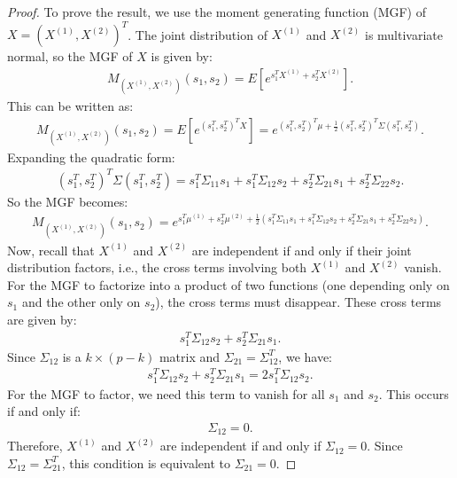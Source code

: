 \begin{proof}
    To prove the result, we use the moment generating function (MGF) of $ X = (X^{(1)}, X^{(2)})^T $. The joint distribution of $ X^{(1)} $ and $ X^{(2)} $ is multivariate normal, so the MGF of $ X $ is given by:
    \begin{align}
        M_{(X^{(1)}, X^{(2)})}(s_1, s_2) = E[e^{s_1^T X^{(1)} + s_2^T X^{(2)}}].
    \end{align}
    This can be written as:
    \begin{align}
        M_{(X^{(1)}, X^{(2)})}(s_1, s_2) = E[e^{(s_1^T, s_2^T)^T X}] = e^{(s_1^T, s_2^T)^T \mu + \frac{1}{2}(s_1^T, s_2^T)^T \Sigma (s_1^T, s_2^T)}.
    \end{align}
    Expanding the quadratic form:
    \begin{align}
        (s_1^T, s_2^T)^T \Sigma (s_1^T, s_2^T) = s_1^T \Sigma_{11} s_1 + s_1^T \Sigma_{12} s_2 + s_2^T \Sigma_{21} s_1 + s_2^T \Sigma_{22} s_2.
    \end{align}
    So the MGF becomes:
    \begin{align}
        M_{(X^{(1)}, X^{(2)})}(s_1, s_2) = e^{s_1^T \mu^{(1)} + s_2^T \mu^{(2)} + \frac{1}{2} \left( s_1^T \Sigma_{11} s_1 + s_1^T \Sigma_{12} s_2 + s_2^T \Sigma_{21} s_1 + s_2^T \Sigma_{22} s_2 \right)}.
    \end{align}
    Now, recall that $ X^{(1)} $ and $ X^{(2)} $ are independent if and only if their joint distribution factors, i.e., the cross terms involving both $ X^{(1)} $ and $ X^{(2)} $ vanish. For the MGF to factorize into a product of two functions (one depending only on $ s_1 $ and the other only on $ s_2 $), the cross terms must disappear. These cross terms are given by:
    \begin{align}
        s_1^T \Sigma_{12} s_2 + s_2^T \Sigma_{21} s_1.
    \end{align}
    Since $ \Sigma_{12} $ is a $ k \times (p-k) $ matrix and $ \Sigma_{21} = \Sigma_{12}^T $, we have:
    \begin{align}
        s_1^T \Sigma_{12} s_2 + s_2^T \Sigma_{21} s_1 = 2 s_1^T \Sigma_{12} s_2.
    \end{align}
    For the MGF to factor, we need this term to vanish for all $ s_1 $ and $ s_2 $. This occurs if and only if:
    \begin{align}
        \Sigma_{12} = 0.
    \end{align}
    Therefore, $ X^{(1)} $ and $ X^{(2)} $ are independent if and only if $ \Sigma_{12} = 0 $. Since $ \Sigma_{12} = \Sigma_{21}^T $, this condition is equivalent to $ \Sigma_{21} = 0 $.
\end{proof}

